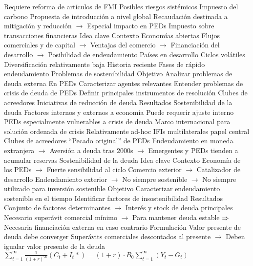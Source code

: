 \documentclass{nuevotema}
\begin{document}
\begin{esquemal}
				\4[] Requiere reforma de artículos de FMI
				\4[] Posibles riesgos sistémicos
				\4 Impuesto del carbono
				\4[] Propuesta de introducción a nivel global
				\4[] Recaudación destinada a mitigación y reducción
				\4[] $\to$ Especial impacto en PEDs
				\4 Impuesto sobre transacciones financieras
	\1 
		\2 Idea clave
			\3 Contexto
				\4 Economías abiertas
				\4[] Flujos comerciales y de capital
				\4[] $\to$ Ventajas del comercio
				\4[] $\to$ Financiación del desarrollo
				\4[] $\to$ Posibilidad de endeudamiento
				\4 Países en desarrollo
				\4[] Ciclos volátiles
				\4[] Diversificación relativamente baja
				\4 Historia reciente
				\4[] Fases de rápido endeudamiento
				\4[] Problemas de sostenibilidad
			\3 Objetivo
				\4 Analizar problemas de deuda externa
				\4[] En PEDs
				\4 Caracterizar agentes relevantes
				\4 Entender problemas de crisis de deuda de PEDs
				\4 Definir principales instrumentos de resolución
				\4[] Clubes de acreedores
				\4[] Iniciativas de reducción de deuda
			\3 Resultados
				\4 Sostenibilidad de la deuda
				\4[] Factores internos y externos a economía
				\4[] Puede requerir ajuste interno
				\4 PEDs especialmente vulnerables a crisis de deuda
				\4 Marco internacional para solución ordenada de crisis
				\4[] Relativamente ad-hoc
				\4[] IFIs multilaterales papel central
				\4[] Clubes de acreedores
				\4 ``Pecado original'' de PEDs
				\4[] Endeudamiento en moneda extranjera
				\4[] $\to$ Aversión a deuda tras 2000s
				\4[] $\to$ Emergentes y PEDs tienden a acumular reservas
		\2 Sostenibilidad de la deuda
			\3 Idea clave
				\4 Contexto
				\4[] Economía de los PEDs
				\4[] $\to$ Fuerte sensibilidad al ciclo
				\4[] Comercio exterior
				\4[] $\to$ Catalizador de desarrollo
				\4[] Endeudamiento exterior
				\4[] $\to$ No siempre sostenible
				\4[] $\to$ No siempre utilizado para inversión sostenible
				\4 Objetivo
				\4[] Caracterizar endeudamiento sostenible en el tiempo
				\4[] Identificar factores de insostenibilidad
				\4 Resultados
				\4[] Conjunto de factores determinantes
				\4[] $\to$ Interés y stock de deuda principales
				\4[] Necesario superávit comercial mínimo
				\4[] $\to$ Para mantener deuda estable
				\4[] $\Rightarrow$ Necesaria financiación externa en caso contrario
			\3 Formulación
				\4 Valor presente de deuda debe converger
				\4[] Superávits comerciales descontados al presente
				\4[] $\to$ Deben igualar valor presente de la deuda
				\4[] $\sum_{t=1}^\infty \frac{1}{(1+r)^\infty} \left( C_t + I_t* \right) = (1+r) \cdot B_0 \sum_{t=1}^\infty (Y_t - G_t)$

\end{esquemal}
\end{document}
